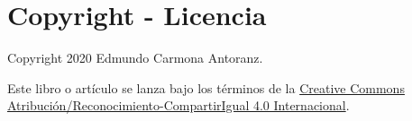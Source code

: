 
\section{Copyright - Licencia}

Copyright 2020 Edmundo Carmona Antoranz.

Este libro o artículo se lanza bajo los términos de la
\href{https://creativecommons.org/licenses/by-sa/4.0/legalcode.es}{Creative Commons Atribución/Reconocimiento-CompartirIgual 4.0 Internacional}.
